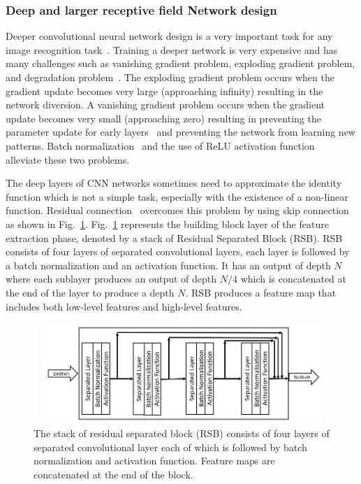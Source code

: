 \subsubsection{ Deep and larger receptive field Network design}

Deeper convolutional neural network design is a very important task for any image recognition task~\cite{he2016deep}. Training a deeper network is very expensive and has many challenges such as vanishing gradient problem, exploding gradient problem, and degradation problem~\cite{he2016deep}. The exploding gradient problem occurs when the gradient update becomes very large (approaching infinity) resulting in the network diversion. A vanishing gradient problem occurs when the gradient update becomes very small (approaching zero) resulting in preventing the parameter update for early layers~\cite{ioffe2015batch} and preventing the network from learning new patterns. Batch normalization~\cite{ioffe2015batch} and the use of ReLU activation function~\cite{krizhevsky2012imagenet} alleviate these two problems.

The deep layers of CNN networks sometimes need to approximate the identity function which is not a simple task, especially with the existence of a non-linear function. Residual connection~\cite{he2016deep} overcomes this problem by using skip connection as shown in Fig.~\ref{fig4}.
Fig.~\ref{fig4} represents the building block layer of the feature extraction phase, denoted by a stack of Residual Separated Block  (RSB). RSB consists of four layers of separated convolutional layers, each layer is followed by a batch normalization and an activation function. It has an output of depth $N$ where each sublayer produces an output of depth $N/4$ which is concatenated at the end of the layer to produce a depth  $N$. RSB produces a feature map that includes both low-level features and high-level features.

\begin{figure}
\begin{center}
\includegraphics[height=38mm,width=14.0cm]{Figures/fig4.jpg}
\caption{The stack of residual separated block  (RSB) consists of four layers of separated convolutional layer each of which is followed by batch normalization and activation function. Feature maps are concatenated at the end of the block.}
\label{fig4}
\end{center}
\end{figure}

